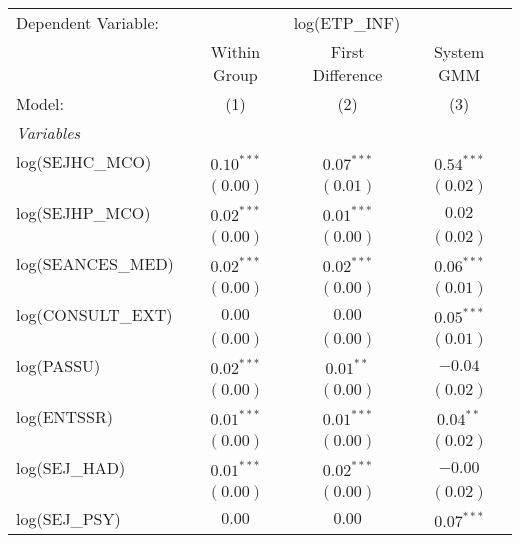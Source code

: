 
\begingroup
\centering
\begin{tabular}{lccc}
   \tabularnewline \midrule \midrule
   Dependent Variable: & \multicolumn{3}{c}{log(ETP\_INF)}                                   \\
                       & Within Group                      & First Difference & System GMM   \\
   Model:              & (1)                               & (2)              & (3)          \\
   \midrule
   \emph{Variables}                                                                          \\
   log(SEJHC\_MCO)     & $0.10^{***}$                      & $0.07^{***}$     & $0.54^{***}$ \\
                       & $(0.00)$                          & $(0.01)$         & $(0.02)$     \\
   log(SEJHP\_MCO)     & $0.02^{***}$                      & $0.01^{***}$     & $0.02$       \\
                       & $(0.00)$                          & $(0.00)$         & $(0.02)$     \\
   log(SEANCES\_MED)   & $0.02^{***}$                      & $0.02^{***}$     & $0.06^{***}$ \\
                       & $(0.00)$                          & $(0.00)$         & $(0.01)$     \\
   log(CONSULT\_EXT)   & $0.00$                            & $0.00$           & $0.05^{***}$ \\
                       & $(0.00)$                          & $(0.00)$         & $(0.01)$     \\
   log(PASSU)          & $0.02^{***}$                      & $0.01^{**}$      & $-0.04$      \\
                       & $(0.00)$                          & $(0.00)$         & $(0.02)$     \\
   log(ENTSSR)         & $0.01^{***}$                      & $0.01^{***}$     & $0.04^{**}$  \\
                       & $(0.00)$                          & $(0.00)$         & $(0.02)$     \\
   log(SEJ\_HAD)       & $0.01^{***}$                      & $0.02^{***}$     & $-0.00$      \\
                       & $(0.00)$                          & $(0.00)$         & $(0.02)$     \\
   log(SEJ\_PSY)       & $0.00$                            & $0.00$           & $0.07^{***}$ \\

\end{tabular}
